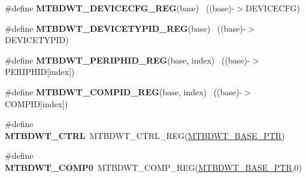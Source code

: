 \begin{DoxyCompactItemize}
\item 
\hypertarget{group___m_t_b_d_w_t___register___accessor___macros_ga3e7e1df1d240c41eec01b0d5b166b40a}{}\#define {\bfseries M\+T\+B\+D\+W\+T\+\_\+\+D\+E\+V\+I\+C\+E\+C\+F\+G\+\_\+\+R\+E\+G}(base)                          ~((base)-\/$>$D\+E\+V\+I\+C\+E\+C\+F\+G)\label{group___m_t_b_d_w_t___register___accessor___macros_ga3e7e1df1d240c41eec01b0d5b166b40a}

\item 
\hypertarget{group___m_t_b_d_w_t___register___accessor___macros_ga1b0104249607c6fb6ae3a943e3ffaa11}{}\#define {\bfseries M\+T\+B\+D\+W\+T\+\_\+\+D\+E\+V\+I\+C\+E\+T\+Y\+P\+I\+D\+\_\+\+R\+E\+G}(base)                      ~((base)-\/$>$D\+E\+V\+I\+C\+E\+T\+Y\+P\+I\+D)\label{group___m_t_b_d_w_t___register___accessor___macros_ga1b0104249607c6fb6ae3a943e3ffaa11}

\item 
\hypertarget{group___m_t_b_d_w_t___register___accessor___macros_ga18a6f971f5ddf5bd0f3c5fd2d2b3b2da}{}\#define {\bfseries M\+T\+B\+D\+W\+T\+\_\+\+P\+E\+R\+I\+P\+H\+I\+D\+\_\+\+R\+E\+G}(base,  index)                ~((base)-\/$>$P\+E\+R\+I\+P\+H\+I\+D\mbox{[}index\mbox{]})\label{group___m_t_b_d_w_t___register___accessor___macros_ga18a6f971f5ddf5bd0f3c5fd2d2b3b2da}

\item 
\hypertarget{group___m_t_b_d_w_t___register___accessor___macros_gae2528012848814bf317362965a786094}{}\#define {\bfseries M\+T\+B\+D\+W\+T\+\_\+\+C\+O\+M\+P\+I\+D\+\_\+\+R\+E\+G}(base,  index)                    ~((base)-\/$>$C\+O\+M\+P\+I\+D\mbox{[}index\mbox{]})\label{group___m_t_b_d_w_t___register___accessor___macros_gae2528012848814bf317362965a786094}

\item 
\hypertarget{group___m_t_b_d_w_t___register___accessor___macros_gadb4142d6299394f942ea20e3b6fae17b}{}\#define {\bfseries M\+T\+B\+D\+W\+T\+\_\+\+C\+T\+R\+L}~M\+T\+B\+D\+W\+T\+\_\+\+C\+T\+R\+L\+\_\+\+R\+E\+G(\hyperlink{group___m_t_b_d_w_t___peripheral_ga97d048bfb5a11293a38c444b8347ff42}{M\+T\+B\+D\+W\+T\+\_\+\+B\+A\+S\+E\+\_\+\+P\+T\+R})\label{group___m_t_b_d_w_t___register___accessor___macros_gadb4142d6299394f942ea20e3b6fae17b}

\item 
\hypertarget{group___m_t_b_d_w_t___register___accessor___macros_ga8d2e850737820e0876358db17f0bd37d}{}\#define {\bfseries M\+T\+B\+D\+W\+T\+\_\+\+C\+O\+M\+P0}~M\+T\+B\+D\+W\+T\+\_\+\+C\+O\+M\+P\+\_\+\+R\+E\+G(\hyperlink{group___m_t_b_d_w_t___peripheral_ga97d048bfb5a11293a38c444b8347ff42}{M\+T\+B\+D\+W\+T\+\_\+\+B\+A\+S\+E\+\_\+\+P\+T\+R},0)\label{group___m_t_b_d_w_t___register___accessor___macros_ga8d2e850737820e0876358db17f0bd37d}


\end{DoxyCompactItemize}
